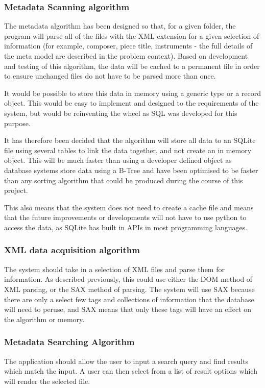 \subsubsection{Metadata Scanning algorithm}
The metadata algorithm has been designed so that, for a given folder, the program will parse all of the files with the XML extension for a given selection of information (for example, composer, piece title, instruments - the full details of the meta model are described in the problem context). Based on development and testing of this algorithm, the data will be cached to a permanent file in order to ensure unchanged files do not have to be parsed more than once.

It would be possible to store this data in memory using a generic type or a record object. This would be easy to implement and designed to the requirements of the system, but would be reinventing the wheel as SQL was developed for this purpose\parencite{SQLite}.

It has therefore been decided that the algorithm will store all data to an SQLite file using several tables to link the data together, and not create an in memory object. This will be much faster than using a developer defined object as database systems store data using a B-Tree and have been optimised to be faster than any sorting algorithm that could be produced during the course of this project\parencite{SQLiteBTree}.

This also means that the system does not need to create a cache file and means that the future improvements or developments will not have to use python to access the data, as SQLite has built in APIs in most programming languages.

\subsubsection{XML data acquisition algorithm}
The system should take in a selection of XML files and parse them for information. As described previously, this could use either the DOM method of XML parsing, or the SAX method of parsing.
The system will use SAX because there are only a select few tags and collections of information that the database will need to peruse, and SAX means that only these tags will have an effect on the algorithm or memory.

\subsubsection{Metadata Searching Algorithm}
The application should allow the user to input a search query and find results which match the input. A user can then select from a list of result options which will render the selected file.

